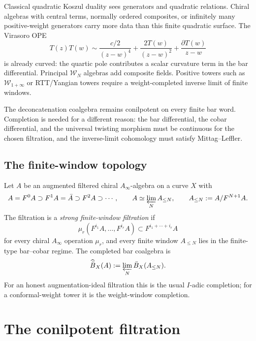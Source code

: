 \begin{observation}\label{obs:quadratic-limitation}
Classical quadratic Koszul duality sees generators and quadratic
relations.  Chiral algebras with central terms, normally ordered
composites, or infinitely many positive-weight generators carry more
data than this finite quadratic surface.  The Virasoro OPE
\[
T(z)T(w)\sim
\frac{c/2}{(z-w)^4}+\frac{2T(w)}{(z-w)^2}
 +\frac{\partial T(w)}{z-w}
\]
is already curved: the quartic pole contributes a scalar curvature
term in the bar differential.  Principal $\mathcal W_N$ algebras add
composite fields.  Positive towers such as $\mathcal W_{1+\infty}$ or
RTT/Yangian towers require a weight-completed inverse limit of finite
windows.

The deconcatenation coalgebra remains conilpotent on every finite bar
word.  Completion is needed for a different reason: the bar
differential, the cobar differential, and the universal twisting
morphism must be continuous for the chosen filtration, and the
inverse-limit cohomology must satisfy Mittag--Leffler.
\end{observation}

\subsection{The finite-window topology}

\begin{definition}\label{idea:I-adic}
Let $A$ be an augmented filtered chiral $A_\infty$-algebra on a curve
$X$ with
\[
A=F^0A\supset F^1A=\bar A\supset F^2A\supset\cdots,
\qquad
A\simeq\varprojlim_N A_{\le N},
\qquad
A_{\le N}:=A/F^{N+1}A .
\]
The filtration is a \emph{strong finite-window filtration} if
\[
\mu_r(F^{i_1}A,\ldots,F^{i_r}A)
\subset F^{i_1+\cdots+i_r}A
\tag{\ast}
\label{eq:nc-strong-filtration}
\]
for every chiral $A_\infty$ operation $\mu_r$, and every finite window
$A_{\le N}$ lies in the finite-type bar--cobar regime.
The completed bar coalgebra is
\[
\widehat{\bar B}_X(A)
:=\varprojlim_N \bar B_X(A_{\le N}).
\]
For an honest augmentation-ideal filtration this is the usual
$I$-adic completion; for a conformal-weight tower it is the
weight-window completion.
\end{definition}

\section{The conilpotent filtration}

